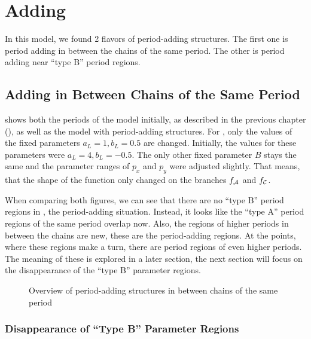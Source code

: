 \chapter{Adding}

In this model, we found 2 flavors of period-adding structures.
The first one is period adding in between the chains of the same period.
The other is period adding near ``type B'' period regions.

\section{Adding in Between Chains of the Same Period}

 shows both the periods of the model initially, as described in the previous chapter (), as well as the model with period-adding structures.
For , only the values of the fixed parameters $a_L = 1, b_L = 0.5$ are changed.
Initially, the values for these parameters were $a_L = 4, b_L = -0.5$.
The only other fixed parameter $B$ stays the same and the parameter ranges of $p_x$ and $p_y$ were adjusted slightly.
That means, that the shape of the function only changed on the branches $f_{\mathcal{A}}$ and $f_{\mathcal{C}}$.

When comparing both figures, we can see that there are no ``type B'' period regions in , the period-adding situation.
Instead, it looks like the ``type A'' period regions of the same period overlap now.
Also, the regions of higher periods in between the chains are new, these are the period-adding regions.
At the points, where these regions make a turn, there are period regions of even higher periods.
The meaning of these is explored in a later section, the next section will focus on the disappearance of the ``type B'' parameter regions.

\begin{figure}
    \centering
    \caption{Overview of period-adding structures in between chains of the same period}
    \label{fig:minrep.adding1.overview}
\end{figure}

\subsection{Disappearance of ``Type B'' Parameter Regions}

